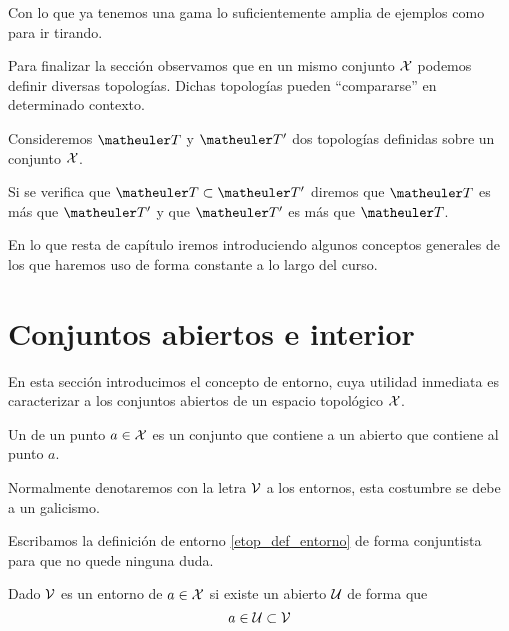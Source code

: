 \begin{exa}[Topologías]
\begin{enumerate}
		
	\end{enumerate}
	Con lo que ya tenemos una gama lo suficientemente amplia de ejemplos como para ir tirando.
\end{exa}
Para finalizar la sección observamos que en un mismo conjunto $\mathcal{X}$ podemos definir diversas topologías. Dichas topologías pueden ``compararse'' en determinado contexto.
\begin{defi}
	Consideremos $\T$ y $\T'$ dos topologías definidas sobre un conjunto $\mathcal{X}$.
	
	Si se verifica que $\T \subset \T'$ diremos que $\T$ es más  que $\T'$ y que $\T'$ es más  que $\T$.
\end{defi}
En lo que resta de capítulo iremos introduciendo algunos conceptos generales de los que haremos uso de forma constante a lo largo del curso.
\section{Conjuntos abiertos e interior}
\label{etop_entornos}
En esta sección introducimos el concepto de entorno, cuya utilidad inmediata es caracterizar a los conjuntos abiertos de un espacio topológico $\mathcal{X}$.
\begin{defi}
	\label{etop_def_entorno}
	Un  de un punto $a\in\mathcal{X}$ es un conjunto que contiene a un abierto que contiene al punto $a$.
\end{defi}
Normalmente denotaremos con la letra $\mathcal{V}$ a los entornos, esta costumbre se debe a un galicismo. %

Escribamos la definición de entorno \ref{etop_def_entorno} de forma conjuntista para que no quede ninguna duda.

Dado $\mathcal{V}$ es un entorno de $a\in \mathcal{X}$ si existe un abierto $\mathcal{U}$ de forma que
\begin{equation}
\label{etop_eq_entorno}
a\in\mathcal{U}\subset\mathcal{V}
\end{equation}

